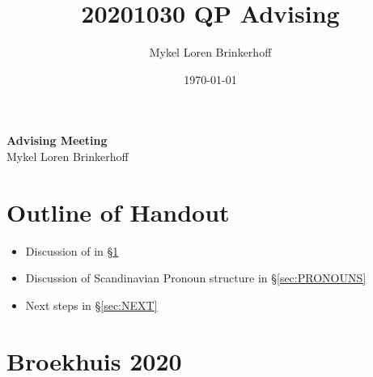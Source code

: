 \documentclass[12pt, letterpaper]{article}
\title{20201030 QP Advising}
\author{Mykel Loren Brinkerhoff}
\date{\today}
\begin{document}
	
	
	
\begin{center}
	{\Large \textbf{Advising Meeting}}\\
	\vspace{6pt}
	Mykel Loren Brinkerhoff
\end{center}
\thispagestyle{fancy}

\section*{Outline of Handout} \label{sec:OUTLINE}
\begin{itemize}
	\item Discussion of \cite{broekhuisUnificationObjectShift2020} in §\ref{sec:BROEKHUIS}
	\item Discussion of Scandinavian Pronoun structure in §\ref{sec:PRONOUNS}
	\item Next steps in §\ref{sec:NEXT}
\end{itemize}

\section{Broekhuis 2020} \label{sec:BROEKHUIS}
\end{document}
